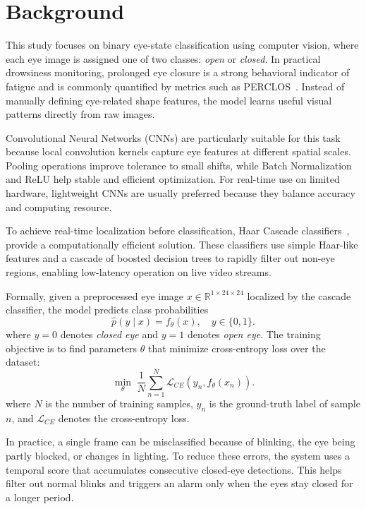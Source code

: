 \documentclass[10pt,twocolumn,letterpaper]{article}
\begin{document}
\section{Background}
This study focuses on binary eye-state classification using computer vision, where each eye image is assigned one of two classes: \textit{open} or \textit{closed}. 
In practical drowsiness monitoring, prolonged eye closure is a strong behavioral indicator of fatigue and is commonly quantified by metrics such as PERCLOS~\cite{dinges1998perclos}. 
Instead of manually defining eye-related shape features, the model learns useful visual patterns directly from raw images.

Convolutional Neural Networks (CNNs) are particularly suitable for this task because local convolution kernels capture eye features at different spatial scales. 
Pooling operations improve tolerance to small shifts, while Batch Normalization and ReLU help stable and efficient optimization. 
For real-time use on limited hardware, lightweight CNNs are usually preferred because they balance accuracy and computing resource.

To achieve real-time localization before classification, Haar Cascade classifiers~\cite{opencv_haarcascades}, provide a computationally efficient solution. These classifiers use simple Haar-like features and a cascade of boosted decision trees to rapidly filter out non-eye regions, enabling low-latency operation on live video streams.

Formally, given a preprocessed eye image $x \in \mathbb{R}^{1 \times 24 \times 24}$ localized by the cascade classifier, the model predicts class probabilities
\begin{equation}
\hat{p}(y \mid x) = f_{\theta}(x), \quad y \in \{0,1\}.
\end{equation}
where $y=0$ denotes \textit{closed eye} and $y=1$ denotes \textit{open eye}. The training objective is to find parameters $\theta$ that minimize cross-entropy loss over the dataset:
\begin{equation}
\min_{\theta}\; \frac{1}{N}\sum_{n=1}^{N} \mathcal{L}_{CE}(y_n, f_{\theta}(x_n)).
\end{equation}
where $N$ is the number of training samples, $y_n$ is the ground-truth label of sample $n$, and $\mathcal{L}_{CE}$ denotes the cross-entropy loss.

In practice, a single frame can be misclassified because of blinking, the eye being partly blocked, or changes in lighting. To reduce these errors, the system uses a temporal score that accumulates consecutive closed-eye detections. This helps filter out normal blinks and triggers an alarm only when the eyes stay closed for a longer period.
\end{document}
